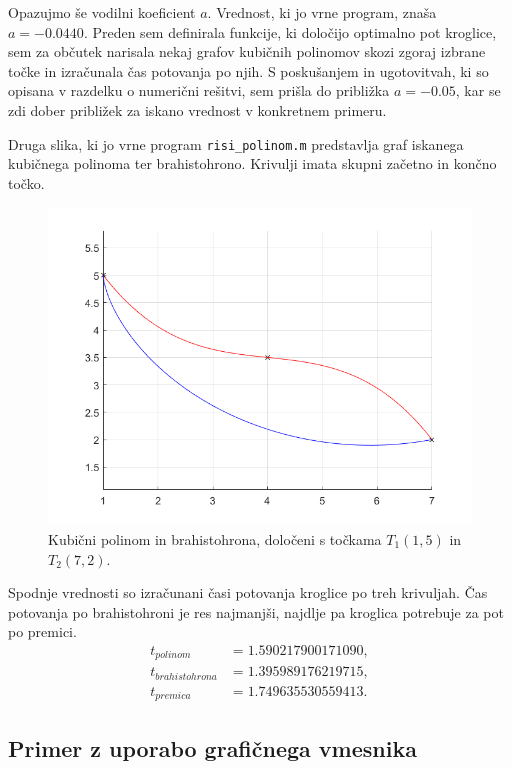 \documentclass[a4paper]{article}
\begin{document}
Opazujmo še vodilni koeficient $a$. Vrednost, ki jo vrne program, znaša $a = -0.0440$. Preden sem definirala funkcije, ki določijo optimalno pot kroglice, sem za občutek narisala nekaj grafov kubičnih polinomov skozi zgoraj izbrane točke in izračunala čas potovanja po njih. S poskušanjem in ugotovitvah, ki so opisana v razdelku o numerični rešitvi, sem prišla do približka $a = -0.05$, kar se zdi dober približek za iskano vrednost v konkretnem primeru. 

Druga slika, ki jo vrne program \texttt{risi\_polinom.m} predstavlja graf iskanega kubičnega polinoma ter brahistohrono. Krivulji imata skupni začetno in končno točko. 
%
\begin{figure}[h!]
\begin{center}
\includegraphics[scale=0.52]{primer2-PolBrah.png}
\caption{Kubični polinom in brahistohrona, določeni s točkama $T_1(1,5)$ in $T_2(7,2)$.}
\end{center}
\end{figure}
%

Spodnje vrednosti so izračunani časi potovanja kroglice po treh krivuljah. Čas potovanja po brahistohroni je res najmanjši, najdlje pa kroglica potrebuje za pot po premici.
%
\begin{align*}
t_{polinom} &= 1.590217900171090, \\
t_{brahistohrona} &= 1.395989176219715, \\
t_{premica} &= 1.749635530559413.
\end{align*}

\subsection{Primer z uporabo grafičnega vmesnika}
\end{document}
